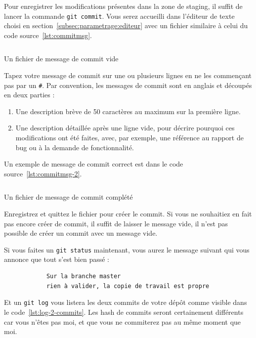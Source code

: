 \documentclass[10pt,a4paper,french]{article}
\begin{document}
        Pour enregistrer les modifications présentes dans la zone de staging, il suffit de lancer la commande \verb|git commit|. Vous serez accueilli dans l'éditeur de texte choisi en section~\ref{subsec:parametrage:editeur} avec un fichier similaire à celui du code source~\ref{lst:commitmsg}.

        \begin{listing}[ht]
            \inputminted{sh}{ressources/COMMITMSG-1.txt}
            \caption{Un fichier de message de commit vide}
            \label{lst:commitmsg}
        \end{listing}

        Tapez votre message de commit sur une ou plusieurs lignes en ne les commençant pas par un \verb|#|. Par convention, les messages de commit sont en anglais et découpés en deux parties :
        \begin{enumerate}
            \item Une description brève de 50 caractères au maximum sur la première ligne.
            \item Une description détaillée après une ligne vide, pour décrire pourquoi ces modifications ont été faites, avec, par exemple, une référence au rapport de bug ou à la demande de fonctionnalité.
        \end{enumerate}
        Un exemple de message de commit correct est dans le code source~\ref{lst:commitmsg-2}.

        \begin{listing}[ht]
            \inputminted{sh}{ressources/COMMITMSG-2.txt}
            \caption{Un fichier de message de commit complété}
            \label{lst:commitmsg-2}
        \end{listing}

        Enregistrez et quittez le fichier pour créer le commit.
        Si vous ne souhaitiez en fait pas encore créer de commit, il suffit de laisser le message vide, il n'est pas possible de créer un commit avec un message vide.

        Si vous faites un \verb|git status| maintenant, vous aurez le message suivant qui vous annonce que tout s'est bien passé :
        \begin{verbatim}
            Sur la branche master
            rien à valider, la copie de travail est propre
        \end{verbatim}

        Et un \verb|git log| vous listera les deux commits de votre dépôt comme visible dans le code~\ref{lst:log-2-commits}. Les hash de commits seront certainement différents car vous n'êtes pas moi, et que vous ne commiterez pas au même moment que moi.
\end{document}
